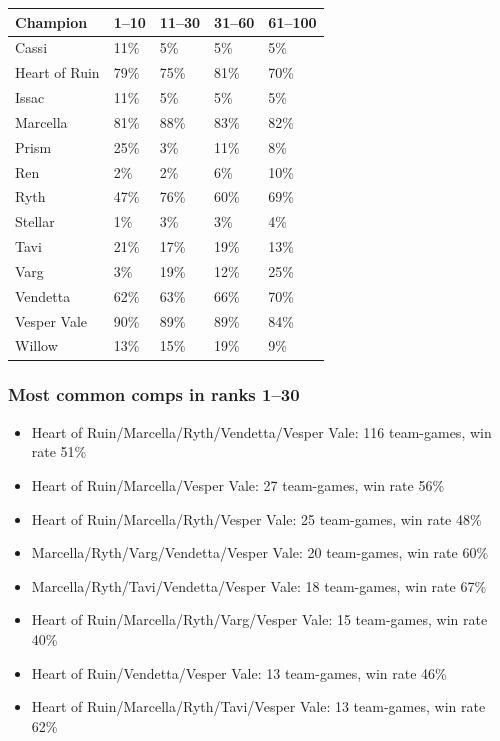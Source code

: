 \documentclass[
  10pt,
]{article}
\newcounter{none} %
\providecommand{\tightlist}{%
  \setlength{\itemsep}{0pt}\setlength{\parskip}{0pt}}
\begin{document}
{\def\LTcaptype{none} %
\begin{longtable}[]{@{}lllll@{}}
\toprule\noalign{}
Champion & 1--10 & 11--30 & 31--60 & 61--100 \\
\midrule\noalign{}
\endhead
\bottomrule\noalign{}
\endlastfoot
Cassi & 11\% & 5\% & 5\% & 5\% \\
Heart of Ruin & 79\% & 75\% & 81\% & 70\% \\
Issac & 11\% & 5\% & 5\% & 5\% \\
Marcella & 81\% & 88\% & 83\% & 82\% \\
Prism & 25\% & 3\% & 11\% & 8\% \\
Ren & 2\% & 2\% & 6\% & 10\% \\
Ryth & 47\% & 76\% & 60\% & 69\% \\
Stellar & 1\% & 3\% & 3\% & 4\% \\
Tavi & 21\% & 17\% & 19\% & 13\% \\
Varg & 3\% & 19\% & 12\% & 25\% \\
Vendetta & 62\% & 63\% & 66\% & 70\% \\
Vesper Vale & 90\% & 89\% & 89\% & 84\% \\
Willow & 13\% & 15\% & 19\% & 9\% \\
\end{longtable}
}

\subsubsection{Most common comps in ranks
1--30}\label{most-common-comps-in-ranks-130}

\begin{itemize}
\tightlist
\item
  Heart of Ruin/Marcella/Ryth/Vendetta/Vesper Vale: 116 team-games, win
  rate 51\%
\item
  Heart of Ruin/Marcella/Vesper Vale: 27 team-games, win rate 56\%
\item
  Heart of Ruin/Marcella/Ryth/Vesper Vale: 25 team-games, win rate 48\%
\item
  Marcella/Ryth/Varg/Vendetta/Vesper Vale: 20 team-games, win rate 60\%
\item
  Marcella/Ryth/Tavi/Vendetta/Vesper Vale: 18 team-games, win rate 67\%
\item
  Heart of Ruin/Marcella/Ryth/Varg/Vesper Vale: 15 team-games, win rate
  40\%
\item
  Heart of Ruin/Vendetta/Vesper Vale: 13 team-games, win rate 46\%
\item
  Heart of Ruin/Marcella/Ryth/Tavi/Vesper Vale: 13 team-games, win rate
  62\%
\end{itemize}
\end{document}
